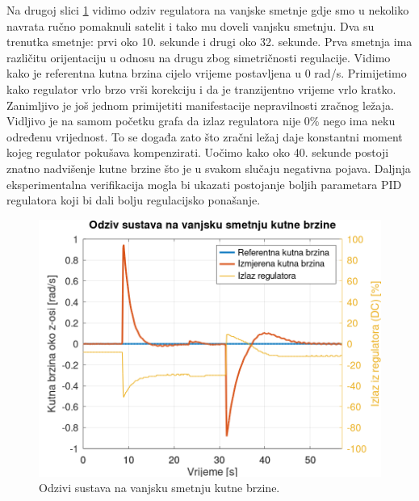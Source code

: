 \documentclass[times, utf8, diplomski, numeric]{templates/template}
\begin{document}
{{        Na drugoj slici \ref{fig:ang_vel_reg_dist} vidimo odziv regulatora na vanjske smetnje gdje smo u nekoliko navrata ručno pomaknuli satelit i tako mu doveli vanjsku smetnju. Dva su trenutka smetnje: prvi oko 10. sekunde i drugi oko 32. sekunde. Prva smetnja ima različitu orijentaciju u odnosu na drugu zbog simetričnosti regulacije. Vidimo kako je referentna kutna brzina cijelo vrijeme postavljena u 0 rad/s. Primijetimo kako regulator vrlo brzo vrši korekciju i da je tranzijentno vrijeme vrlo kratko. Zanimljivo je još jednom primijetiti manifestacije nepravilnosti zračnog ležaja. Vidljivo je na samom početku grafa da izlaz regulatora nije 0\% nego ima neku određenu vrijednost. To se događa zato što zračni ležaj daje konstantni moment kojeg regulator pokušava kompenzirati. Uočimo kako oko 40. sekunde postoji znatno nadvišenje kutne brzine što je u svakom slučaju negativna pojava. Daljnja eksperimentalna verifikacija mogla bi ukazati postojanje boljih parametara PID regulatora koji bi dali bolju regulacijsko ponašanje.

        \begin{figure}[htb]
        \centering
        \includegraphics[width=1.0\textwidth]{other/ang_vel_reg_dist.png}
        \caption{Odzivi sustava na vanjsku smetnju kutne brzine.}
        \label{fig:ang_vel_reg_dist}
        \end{figure}

}}
\end{document}
